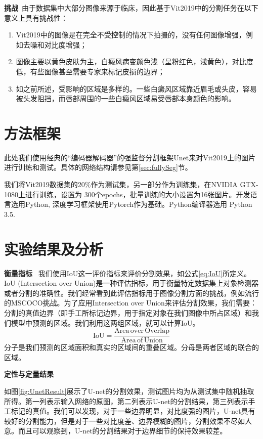\textbf {挑战}~由于数据集中大部分图像来源于临床，因此基于Vit2019中的分割任务在以下意义上具有挑战性：
\begin{enumerate}
\item Vit2019中的图像是在完全不受控制的情况下拍摄的，没有任何图像增强，例如去噪和对比度增强；
\item 图像主要以黄色皮肤为主，白癜风病变颜色浅（呈粉红色，浅黄色），对比度低，有些图像甚至需要专家来标记皮损的边界；
\item 如之前所述，受影响的区域是多样的。一些白癜风区域靠近眉毛或头皮，容易被头发阻挡，而唇部周围的一些白癜风区域易受唇部本身颜色的影响。
\end{enumerate}

\section{方法框架}

此处我们使用经典的``编码器解码器''的强监督分割框架Unet来对Vit2019上的图片进行训练和测试。具体的网络结构请参见第\ref{sec:fullySeg}节。

我们将Vit2019数据集的20\%作为测试集，另一部分作为训练集，在NVIDIA GTX-1080上进行训练，设置为 300个epochs，批量训练的大小设置为16张图片。开发语言选用Python, 深度学习框架使用Pytorch作为基础。Python编译器选用 Python 3.5.


\section{实验结果及分析}

\textbf{衡量指标}~
我们使用IoU这一评价指标来评价分割效果，如公式\ref{eq:IoU}所定义。IoU (Intersection over Union)是一种评估指标，用于衡量特定数据集上对象检测器或者分割的准确性。我们经常看到此评估指标用于图像分割方面的挑战，例如流行的MSCOCO挑战。为了应用Intersection over Union来评估分割效果，我们需要：分割的真值边界（即手工所标记边界，用于指定对象在我们图像中所占区域）和我们模型中预测的区域。我们利用这两组区域，就可以计算IoU。 
\begin{equation}
\label{eq:IoU}
\mathrm{IoU}=\frac{\mathrm {Area\,over\,Overlap}}{\mathrm {Area
\,of\,Union}}
\end{equation}
分子是我们预测的区域面积和真实的区域间的重叠区域。分母是两者区域的联合的区域。

\textbf{定性与定量结果}

如图\ref{fig:UnetResult}展示了U-net的分割效果，测试图片均为从测试集中随机抽取所得。第一列表示输入网络的原图，第二列表示U-net的分割结果，第三列表示手工标记的真值。我们可以发现，对于一些边界明显，对比度强的图片，U-net具有较好的分割能力，但是对于一些对比度差、边界模糊的图片，分割效果不尽如人意。而且可以观察到，U-net的分割结果对于边界细节的保持效果较差。

